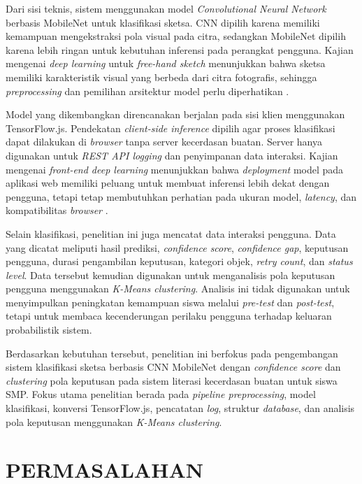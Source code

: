 \documentclass[12pt,a4paper,oneside,openany]{report}
\begin{document}
Dari sisi teknis, sistem menggunakan model \textit{Convolutional Neural Network} berbasis MobileNet untuk klasifikasi sketsa. CNN dipilih karena memiliki kemampuan mengekstraksi pola visual pada citra, sedangkan MobileNet dipilih karena lebih ringan untuk kebutuhan inferensi pada perangkat pengguna. Kajian mengenai \textit{deep learning} untuk \textit{free-hand sketch} menunjukkan bahwa sketsa memiliki karakteristik visual yang berbeda dari citra fotografis, sehingga \textit{preprocessing} dan pemilihan arsitektur model perlu diperhatikan \cite{ref6}.

Model yang dikembangkan direncanakan berjalan pada sisi klien menggunakan TensorFlow.js. Pendekatan \textit{client-side inference} dipilih agar proses klasifikasi dapat dilakukan di \textit{browser} tanpa server kecerdasan buatan. Server hanya digunakan untuk \textit{REST API logging} dan penyimpanan data interaksi. Kajian mengenai \textit{front-end deep learning} menunjukkan bahwa \textit{deployment} model pada aplikasi web memiliki peluang untuk membuat inferensi lebih dekat dengan pengguna, tetapi tetap membutuhkan perhatian pada ukuran model, \textit{latency}, dan kompatibilitas \textit{browser} \cite{ref7}.

Selain klasifikasi, penelitian ini juga mencatat data interaksi pengguna. Data yang dicatat meliputi hasil prediksi, \textit{confidence score}, \textit{confidence gap}, keputusan pengguna, durasi pengambilan keputusan, kategori objek, \textit{retry count}, dan \textit{status level}. Data tersebut kemudian digunakan untuk menganalisis pola keputusan pengguna menggunakan \textit{K-Means clustering}. Analisis ini tidak digunakan untuk menyimpulkan peningkatan kemampuan siswa melalui \textit{pre-test} dan \textit{post-test}, tetapi untuk membaca kecenderungan perilaku pengguna terhadap keluaran probabilistik sistem.

Berdasarkan kebutuhan tersebut, penelitian ini berfokus pada pengembangan sistem klasifikasi sketsa berbasis CNN MobileNet dengan \textit{confidence score} dan \textit{clustering} pola keputusan pada sistem literasi kecerdasan buatan untuk siswa SMP. Fokus utama penelitian berada pada \textit{pipeline preprocessing}, model klasifikasi, konversi TensorFlow.js, pencatatan \textit{log}, struktur \textit{database}, dan analisis pola keputusan menggunakan \textit{K-Means clustering}.

\section{PERMASALAHAN}
\label{sec:permasalahan}
\end{document}
